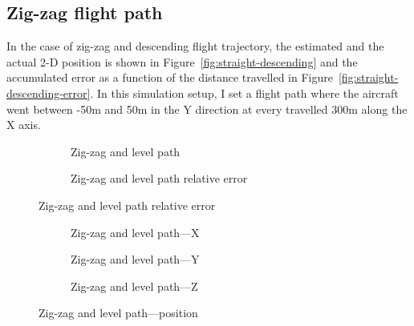 \subsection{Zig-zag flight path}

In the case of zig-zag and descending flight trajectory, the estimated and the actual 2-D position is shown in Figure~\ref{fig:straight-descending} and the accumulated error as a function of the distance travelled in Figure~\ref{fig:straight-descending-error}. In this simulation setup, I set a flight path where the aircraft went between -50\si{\meter} and 50\si{\meter} in the Y direction at every travelled 300\si{\meter} along the X axis.

\begin{figure}[H]
    \centering
    \begin{subfigure}{0.45\textwidth}
        
        \caption{Zig-zag and level path}\label{fig:zig-zag-level}
    \end{subfigure}
    \begin{subfigure}{0.45\textwidth}
        
        \caption{Zig-zag and level path relative error}\label{fig:zig-zag-level-error}
    \end{subfigure}
\end{figure}

\begin{figure}[H]
    \centering
    \begin{subfigure}{0.3\textwidth}
        
        \caption{Zig-zag and level path---X}
    \end{subfigure}
    \hfill
    \begin{subfigure}{0.3\textwidth}
        
        \caption{Zig-zag and level path---Y}
    \end{subfigure}
    \hfill
    \begin{subfigure}{0.3\textwidth}
        
        \caption{Zig-zag and level path---Z}
    \end{subfigure}
    \caption{Zig-zag and level path---position}\label{fig:zig-zag-level-pos}
\end{figure}

